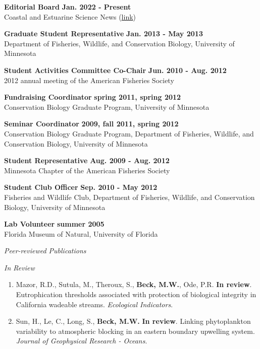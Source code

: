 \documentclass[letterpaper,12pt]{article}
\newcommand{\sectitle}[1]{\vspace{\baselineskip} \centerline{\large{\textit{#1}}}}
\newcommand{\subsectitle}[1]{\vspace{\baselineskip} \centerline{\normalsize{\textit{#1}}}}
\begin{document}
{\bf Editorial Board} \hfill {\bf Jan. 2022 - Present} \\
Coastal and Estuarine Science News (\href{https://www.cerf.science/cesn}{link})

{\bf Graduate Student Representative} \hfill {\bf Jan. 2013 - May 2013} \\
Department of Fisheries, Wildlife, and Conservation Biology, University of Minnesota

{\bf Student Activities Committee Co-Chair} \hfill {\bf Jun. 2010 - Aug. 2012} \\
2012 annual meeting of the American Fisheries Society

{\bf Fundraising Coordinator} \hfill {\bf spring 2011, spring 2012} \\
Conservation Biology Graduate Program, University of Minnesota

{\bf Seminar Coordinator} \hfill {\bf 2009, fall 2011, spring 2012} \\
Conservation Biology Graduate Program, Department of Fisheries, Wildlife, and Conservation Biology, University of Minnesota

{\bf Student Representative} \hfill {\bf Aug. 2009 - Aug. 2012} \\
Minnesota Chapter of the American Fisheries Society

{\bf Student Club Officer} \hfill {\bf Sep. 2010 - May 2012} \\
Fisheries and Wildlife Club, Department of Fisheries, Wildlife, and Conservation Biology, University of Minnesota 

{\bf Lab Volunteer} \hfill {\bf summer 2005} \\
Florida Museum of Natural, University of Florida

\sectitle{Peer-reviewed Publications}

\subsectitle{In Review}

\begin{enumerate}

\item Mazor, R.D., Sutula, M., Theroux, S., \textbf{Beck, M.W.}, Ode, P.R. \textbf{In review}. Eutrophication thresholds associated with protection of biological integrity in California wadeable streams. \textit{Ecological Indicators}.

\item Sun, H., Le, C., Long, S., \textbf{Beck, M.W.} \textbf{In review}. Linking phytoplankton variability to atmospheric blocking in an eastern boundary upwelling system. \textit{Journal of Geophysical Research - Oceans}.


\end{enumerate}
\end{document}
